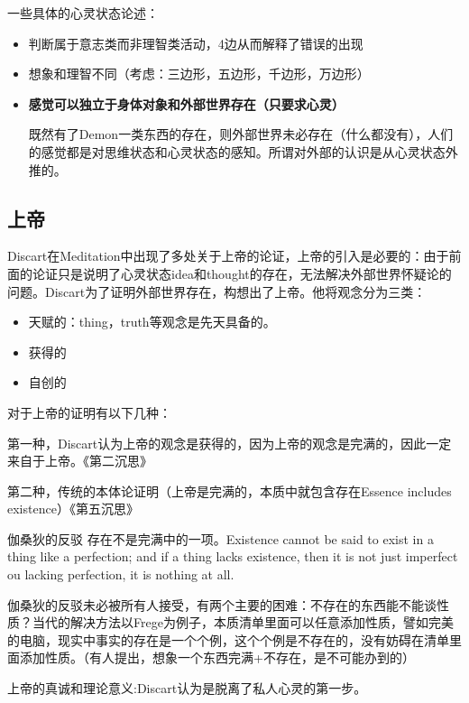 一些具体的心灵状态论述：

\begin{itemize}
    \item 判断属于意志类而非理智类活动，4边从而解释了错误的出现
    \item 想象和理智不同（考虑：三边形，五边形，千边形，万边形）
    \item \textbf{感觉可以独立于身体对象和外部世界存在（只要求心灵）}
    
    既然有了Demon一类东西的存在，则外部世界未必存在（什么都没有），人们的感觉都是对思维状态和心灵状态的感知。所谓对外部的认识是从心灵状态外推的。
\end{itemize}

\subsection{上帝}

Discart在Meditation中出现了多处关于上帝的论证，上帝的引入是必要的：由于前面的论证只是说明了心灵状态idea和thought的存在，无法解决外部世界怀疑论的问题。Discart为了证明外部世界存在，构想出了上帝。他将观念分为三类：

\begin{itemize}
    \item 天赋的：thing，truth等观念是先天具备的。
    \item 获得的
    \item 自创的
\end{itemize}

对于上帝的证明有以下几种：

第一种，Discart认为上帝的观念是获得的，因为上帝的观念是完满的，因此一定来自于上帝。《第二沉思》

第二种，传统的本体论证明（上帝是完满的，本质中就包含存在Essence includes existence）《第五沉思》

\begin{fancybox}{伽桑狄的反驳}
    存在不是完满中的一项。Existence cannot be said to exist in a thing like a perfection; and if a thing lacks existence, then it is not just imperfect ou lacking perfection, it is nothing at all.
\end{fancybox}

伽桑狄的反驳未必被所有人接受，有两个主要的困难：不存在的东西能不能谈性质？当代的解决方法以Frege为例子，本质清单里面可以任意添加性质，譬如完美的电脑，现实中事实的存在是一个个例，这个个例是不存在的，没有妨碍在清单里面添加性质。（有人提出，想象一个东西完满+不存在，是不可能办到的）

上帝的真诚和理论意义:Discart认为是脱离了私人心灵的第一步。

